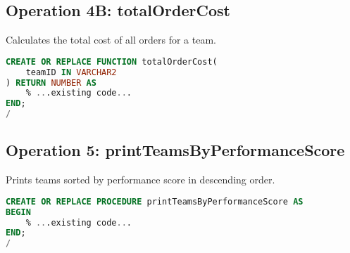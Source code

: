 \subsection{Operation 4B: totalOrderCost}
Calculates the total cost of all orders for a team.
\begin{lstlisting}[language=SQL]
CREATE OR REPLACE FUNCTION totalOrderCost(
    teamID IN VARCHAR2
) RETURN NUMBER AS
    % ...existing code...
END;
/
\end{lstlisting}

\subsection{Operation 5: printTeamsByPerformanceScore}
Prints teams sorted by performance score in descending order.
\begin{lstlisting}[language=SQL]
CREATE OR REPLACE PROCEDURE printTeamsByPerformanceScore AS
BEGIN
    % ...existing code...
END;
/
\end{lstlisting}
